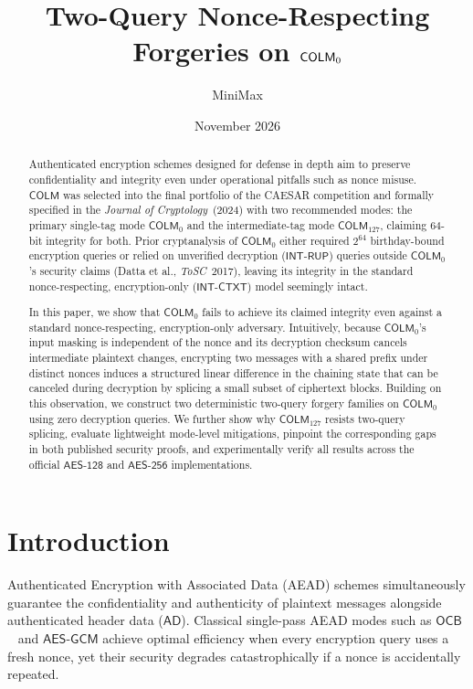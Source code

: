 \documentclass[11pt,a4paper]{article}
\title{\textbf{Two-Query Nonce-Respecting Forgeries on \texorpdfstring{$\COLMzero$}{COLM\_0}}}
\author{MiniMax}
\date{November 2026}
\theoremstyle{definition}
\theoremstyle{remark}
\newcommand{\COLM}{\mathsf{COLM}}
\newcommand{\COLMzero}{\mathsf{COLM}_0}
\newcommand{\COLMott}{\mathsf{COLM}_{127}}
\newcommand{\AD}{\mathsf{AD}}
\begin{document}
\maketitle

\begin{abstract}
Authenticated encryption schemes designed for defense in depth aim to preserve confidentiality and integrity even under operational pitfalls such as nonce misuse. $\COLM$ was selected into the final portfolio of the CAESAR competition and formally specified in the \emph{Journal of Cryptology}~(2024) with two recommended modes: the primary single-tag mode $\COLMzero$ and the intermediate-tag mode $\COLMott$, claiming $64$-bit integrity for both. Prior cryptanalysis of $\COLMzero$ either required $2^{64}$ birthday-bound encryption queries or relied on unverified decryption ($\mathsf{INT\text{-}RUP}$) queries outside $\COLMzero$'s security claims (Datta et al., \emph{ToSC}~2017), leaving its integrity in the standard nonce-respecting, encryption-only ($\mathsf{INT\text{-}CTXT}$) model seemingly intact.

In this paper, we show that $\COLMzero$ fails to achieve its claimed integrity even against a standard nonce-respecting, encryption-only adversary. Intuitively, because $\COLMzero$'s input masking is independent of the nonce and its decryption checksum cancels intermediate plaintext changes, encrypting two messages with a shared prefix under distinct nonces induces a structured linear difference in the chaining state that can be canceled during decryption by splicing a small subset of ciphertext blocks. Building on this observation, we construct two deterministic two-query forgery families on $\COLMzero$ using zero decryption queries. We further show why $\COLMott$ resists two-query splicing, evaluate lightweight mode-level mitigations, pinpoint the corresponding gaps in both published security proofs, and experimentally verify all results across the official $\mathsf{AES\text{-}128}$ and $\mathsf{AES\text{-}256}$ implementations.
\end{abstract}

\section{Introduction}

Authenticated Encryption with Associated Data (AEAD) schemes simultaneously guarantee the confidentiality and authenticity of plaintext messages alongside authenticated header data ($\AD$). Classical single-pass AEAD modes such as $\mathsf{OCB}$~\cite{KR11} and $\mathsf{AES\text{-}GCM}$ achieve optimal efficiency when every encryption query uses a fresh nonce, yet their security degrades catastrophically if a nonce is accidentally repeated.
\end{document}

